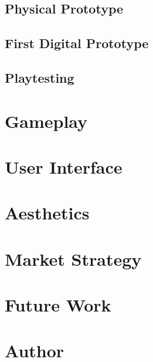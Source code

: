 \documentclass{scrreprt}
\begin{document}
		\section{Physical Prototype}
		
		\section{First Digital Prototype}
			
		\section{Playtesting}
	
	\chapter{Gameplay}
	
	\chapter{User Interface}
		
	\chapter{Aesthetics}
		
	\chapter{Market Strategy}
		
	\chapter{Future Work}
		
	\chapter{Author}
		
\end{document}

